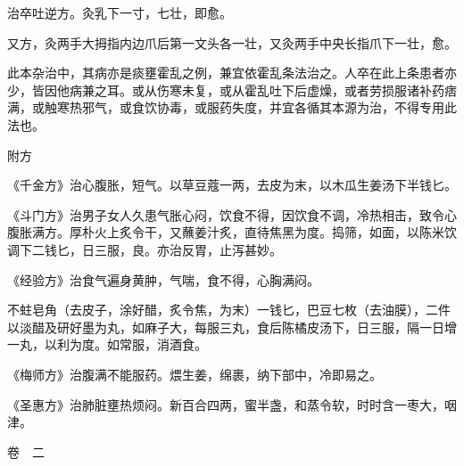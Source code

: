 \documentclass[12pt,UTF8]{ctexbook}
\begin{document}
治卒吐逆方。灸乳下一寸，七壮，即愈。

又方，灸两手大拇指内边爪后第一文头各一壮，又灸两手中央长指爪下一壮，愈。

此本杂治中，其病亦是痰壅霍乱之例，兼宜依霍乱条法治之。人卒在此上条患者亦少，皆因他病兼之耳。或从伤寒未复，或从霍乱吐下后虚燥，或者劳损服诸补药痞满，或触寒热邪气，或食饮协毒，或服药失度，并宜各循其本源为治，不得专用此法也。

附方

《千金方》治心腹胀，短气。以草豆蔻一两，去皮为末，以木瓜生姜汤下半钱匕。

《斗门方》治男子女人久患气胀心闷，饮食不得，因饮食不调，冷热相击，致令心腹胀满方。厚朴火上炙令干，又蘸姜汁炙，直待焦黑为度。捣筛，如面，以陈米饮调下二钱匕，日三服，良。亦治反胃，止泻甚妙。

《经验方》治食气遍身黄肿，气喘，食不得，心胸满闷。

不蛀皂角（去皮子，涂好醋，炙令焦，为末）一钱匕，巴豆七枚（去油膜），二件以淡醋及研好墨为丸，如麻子大，每服三丸，食后陈橘皮汤下，日三服，隔一日增一丸，以利为度。如常服，消酒食。

《梅师方》治腹满不能服药。煨生姜，绵裹，纳下部中，冷即易之。

《圣惠方》治肺脏壅热烦闷。新百合四两，蜜半盏，和蒸令软，时时含一枣大，咽津。


卷　二


\backmatter
\end{document}
